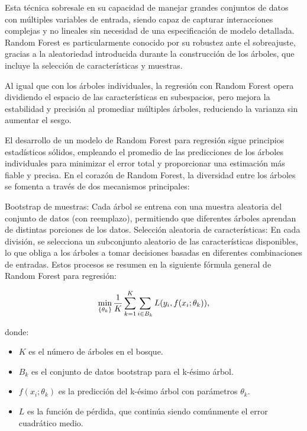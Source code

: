 \documentclass[
  11pt,
  bookmarksnumbered]{article}
\providecommand{\tightlist}{%
  \setlength{\itemsep}{0pt}\setlength{\parskip}{0pt}}
\begin{document}
Esta técnica sobresale en su capacidad de manejar grandes conjuntos de datos con múltiples variables de entrada, siendo capaz de capturar interacciones complejas y no lineales sin necesidad de una especificación de modelo detallada.
Random Forest es particularmente conocido por su robustez ante el sobreajuste, gracias a la aleatoriedad introducida durante la construcción de los árboles, que incluye la selección de características y muestras.

Al igual que con los árboles individuales, la regresión con Random Forest opera dividiendo el espacio de las características en subespacios, pero mejora la estabilidad y precisión al promediar múltiples árboles, reduciendo la varianza sin aumentar el sesgo.

El desarrollo de un modelo de Random Forest para regresión sigue principios estadísticos sólidos, empleando el promedio de las predicciones de los árboles individuales para minimizar el error total y proporcionar una estimación más fiable y precisa.
En el corazón de Random Forest, la diversidad entre los árboles se fomenta a través de dos mecanismos principales:

Bootstrap de muestras: Cada árbol se entrena con una muestra aleatoria del conjunto de datos (con reemplazo), permitiendo que diferentes árboles aprendan de distintas porciones de los datos.
Selección aleatoria de características: En cada división, se selecciona un subconjunto aleatorio de las características disponibles, lo que obliga a los árboles a tomar decisiones basadas en diferentes combinaciones de entradas.
Estos procesos se resumen en la siguiente fórmula general de Random Forest para regresión:


\begin{equation}
\large \min_{\{\theta_k\}} \frac{1}{K} \sum_{k=1}^{K} \sum_{i \in B_k} L(y_i, f(x_i;\theta_k)),
\end{equation}

donde:

\begin{itemize}
\tightlist
\item
  \(K\) es el número de árboles en el bosque.
\item
  \(B_k\) es el conjunto de datos bootstrap para el k-ésimo árbol.
\item
  \(f(x_i;\theta_k)\) es la predicción del k-ésimo árbol con parámetros \(\theta_k\).
\item
  \(L\) es la función de pérdida, que continúa siendo comúnmente el error cuadrático medio.
\end{itemize}
\end{document}
